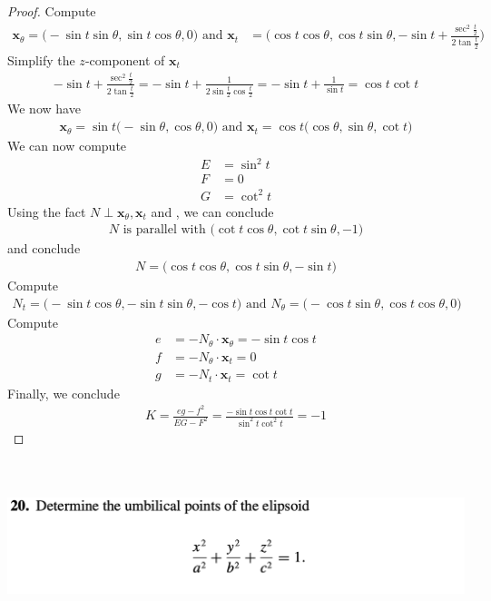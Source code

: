 \documentclass{report}
\begin{document}
\begin{proof}
Compute 
 \begin{align*}
\textbf{x}_\theta= \Big(-\sin t \sin \theta, \sin t \cos \theta , 0 \Big)\text{ and }\textbf{x}_t &= \Big(\cos t \cos \theta , \cos t \sin \theta ,- \sin t + \frac{\sec^2 \frac{t}{2}}{2 \tan \frac{t}{2}}  \Big)
\end{align*}
Simplify the $z$-component of  $\textbf{x}_t$
\begin{align}
\label{simp1}
 -\sin t + \frac{\sec^2 \frac{t}{2}}{2 \tan \frac{t}{2}}= - \sin t +\frac{1}{2 \sin \frac{t}{2}\cos \frac{t}{2}}= -\sin t + \frac{1}{\sin t}= \cos t \cot t 
\end{align}
We now have 
\begin{align*}
\textbf{x}_\theta = \sin t \Big(-\sin \theta, \cos \theta ,0 \Big)\text{ and }\textbf{x}_t = \cos t \Big(\cos \theta, \sin \theta, \cot t \Big)
\end{align*}
We can now compute
\begin{align*}
E&= \sin^2 t\\
F&= 0 \\
G&= \cot^2 t
\end{align*}
Using the fact $N\perp \textbf{x}_\theta, \textbf{x}_t$ and , we can conclude 
\begin{align*}
N\text{ is parallel with }\Big(\cot t \cos \theta , \cot t \sin \theta, -1 \Big)
\end{align*}
and conclude 
\begin{align*}
N=\Big(\cos t \cos \theta, \cos t \sin \theta, -\sin t \Big)
\end{align*}
Compute 
\begin{align*}
N_t=\Big(- \sin t \cos \theta, -\sin t \sin \theta, -\cos t \Big)\text{ and }N_\theta = \Big(-\cos t \sin \theta, \cos t \cos \theta, 0 \Big)
\end{align*}
Compute 
\begin{align*}
e&=-N_\theta \cdot \textbf{x}_\theta = -\sin t \cos t\\
f&=-N_\theta \cdot \textbf{x}_t= 0\\
g&=-N_t \cdot \textbf{x}_t= \cot t
\end{align*}
Finally, we conclude 
\begin{align*}
K=\frac{eg-f^2}{EG-F^2}=\frac{-\sin t \cos t \cot t}{\sin^2 t \cot^2 t  }=-1
\end{align*}



\end{proof}
\begin{question}{}{}
\includegraphics[height=5cm,width=18cm]{hw5q10}
\end{question}
\end{document}
